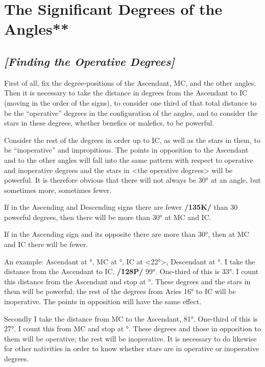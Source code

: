 \section{The Significant Degrees of the Angles**}

\subsection{\textit{[Finding the Operative Degrees]}}
First of all, fix the degree-positions of the Ascendant, MC, and the other angles. Then it is necessary to take the distance in degrees from the Ascendant to IC (moving in the order of the signs), to consider one third of that total distance to be the “operative” degrees in the configuration of the angles, and to consider the stars in these degrees, whether benefics or malefics, to be powerful. 

Consider the rest of the degrees in order up to IC, as well as the stars in them, to be “inoperative” and impropitious. The points in opposition to the Ascendant and to the other angles will fall into the same pattern with respect to operative
and inoperative degrees and the stars in <the operative degrees> will be powerful. It is therefore obvious that there will not always be 30° at an angle, but sometimes more, sometimes fewer. 

If in the Ascending and Descending signs there are fewer \textbf{/135K/} than 30 powerful degrees, then there will be more than 30° at MC and IC. 

If in the Ascending sign and its opposite there are more than 30°, then at MC and IC there will be fewer.

An example: Ascendant at \Pisces\xspace 13°, MC at \Sagittarius\xspace 22°, IC at \Gemini <22°>, Descendant at
\Virgo\xspace 13°. I take the distance from the Ascendant to IC, \textbf{/128P/} 99°. One-third of this is 33°. I count this
distance from the Ascendant and stop at \Aries\xspace 16°. These degrees and the stars in them will be powerful; the rest of the degrees from Aries 16° to IC will be inoperative. The points in opposition will have the same effect. 

Secondly I take the distance from MC to the Ascendant, 81°. One-third of this is 27°. I count this from MC and stop at \Capricorn\xspace 19°. These degrees and those in opposition to them will be operative; the rest will be inoperative. It is necessary to do likewise for other nativities in order to know whether stars are in operative or inoperative degrees.

